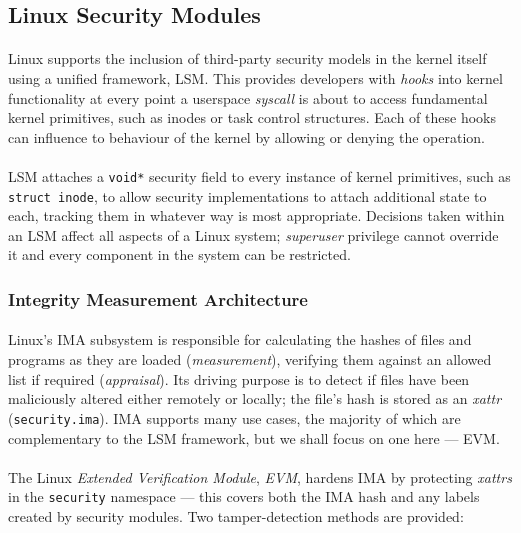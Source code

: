\subsection{Linux Security Modules}
\label{sec:lsm}

\paragraph{} Linux supports the inclusion of third-party security models in the kernel itself using a unified framework, LSM. This provides developers with \textit{hooks} into kernel functionality at every point a userspace \textit{syscall} is about to access fundamental kernel primitives, such as inodes or task control structures. Each of these hooks can influence to behaviour of the kernel by allowing or denying the operation.

\paragraph{} LSM attaches a \texttt{void*} security field to every instance of kernel primitives, such as \texttt{struct inode}, to allow security implementations to attach additional state to each, tracking them in whatever way is most appropriate. Decisions taken within an LSM affect all aspects of a Linux system; \textit{superuser} privilege cannot override it and every component in the system can be restricted.


\subsubsection{Integrity Measurement Architecture}

\paragraph{} Linux's IMA subsystem is responsible for calculating the hashes of files and programs as they are loaded (\textit{measurement}), verifying them against an allowed list if required (\textit{appraisal}). Its driving purpose is to detect if files have been maliciously altered either remotely or locally; the file's hash is stored as an \textit{xattr} (\texttt{security.ima}). IMA supports many use cases, the majority of which are complementary to the LSM framework, but we shall focus on one here --- EVM.

\paragraph{} The Linux \textit{Extended Verification Module}, \textit{EVM}, hardens IMA by protecting \textit{xattrs} in the \texttt{security} namespace --- this covers both the IMA hash and any labels created by security modules. Two tamper-detection methods are provided:

